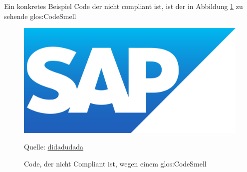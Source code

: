 \documentclass[../main.tex]{subfiles}
\begin{document}
Ein konkretes Beispiel Code der nicht compliant ist, ist der in Abbildung \ref{fig:codecompliance} zu sehende \gls{glos:CodeSmell}

\begin{figure}[ht]
    \centering
    \includegraphics[scale=.21]{bilder/SAPLogo.png}
    \caption{Code, der nicht Compliant ist, wegen einem \gls{glos:CodeSmell}}
    \footnotesize Quelle: \url{didadudada}
    \label{fig:codecompliance}
\end{figure}
\end{document}
